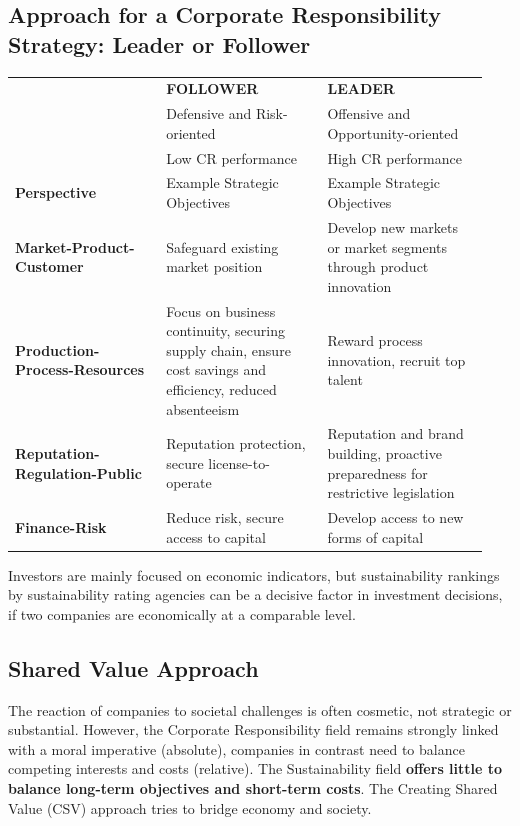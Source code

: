 \documentclass[11pt]{article}
\theoremstyle{definition}
\begin{document}
\subsection{Approach for a Corporate Responsibility Strategy: Leader or Follower}
\begin{tabularx}{\linewidth}{>{\raggedright}p{0.3\linewidth} >{\raggedright}p{0.32\linewidth} >{\raggedleft\arraybackslash}p{0.32\linewidth}}
	& \cellcolor{SteelBlue1!75} \textbf{FOLLOWER} & \cellcolor{SteelBlue1!75} \textbf{LEADER}\\
	& \cellcolor{SteelBlue1!75} Defensive and Risk-oriented & \cellcolor{SteelBlue1!75} Offensive and Opportunity-oriented\\
	& \cellcolor{SteelBlue1!75} Low CR performance & \cellcolor{SteelBlue1!75} High CR performance\\[1em]
	\cellcolor{DodgerBlue1!25} \textbf{Perspective} & \cellcolor{DodgerBlue1!25} Example Strategic Objectives & \cellcolor{DodgerBlue1!25} Example Strategic Objectives\\[1em]
	\cellcolor{DodgerBlue1!25} \textbf{Market-Product-Customer} & Safeguard existing market position & Develop new markets or market segments through product innovation\\[1em]
	\cellcolor{DodgerBlue1!25} \textbf{Production-Process-Resources} & Focus on business continuity, securing supply chain, ensure cost savings and efficiency, reduced absenteeism & Reward process innovation, recruit top talent\\[1em]
	\cellcolor{DodgerBlue1!25} \textbf{Reputation-Regulation-Public} & Reputation protection, secure license-to-operate & Reputation and brand building, proactive preparedness for restrictive legislation\\[1em]
	\cellcolor{DodgerBlue1!25} \textbf{Finance-Risk} & Reduce risk, secure access to capital & Develop access to new forms of capital\\[1em]
\end{tabularx}
Investors are mainly focused on economic indicators, but sustainability rankings by sustainability rating agencies can be a decisive factor in investment decisions, if two companies are economically at a comparable level.

\subsection{Shared Value Approach}
The reaction of companies to societal challenges is often cosmetic, not strategic or substantial. However, the Corporate Responsibility field remains strongly linked with a moral imperative (absolute), companies in contrast need to balance competing interests and costs (relative). The Sustainability field \textbf{offers little to balance long-term objectives and short-term costs}. The Creating Shared Value (CSV) approach tries to bridge economy and society.
\end{document}
